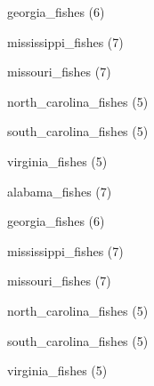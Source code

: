 \documentclass[11pt]{article}
\begin{document}
\begin{multicols}{2}
\vspace{1\baselineskip}

georgia\_fishes (6)

\vspace{1\baselineskip}

mississippi\_fishes (7)

\vspace{1\baselineskip}

missouri\_fishes (7)

\vspace{1\baselineskip}

north\_carolina\_fishes (5)

\vspace{1\baselineskip}

south\_carolina\_fishes (5)

\vspace{1\baselineskip}

virginia\_fishes (5)

\vspace{1\baselineskip}

alabama\_fishes (7)

\vspace{1\baselineskip}

georgia\_fishes (6)

\vspace{1\baselineskip}

mississippi\_fishes (7)

\vspace{1\baselineskip}

missouri\_fishes (7)

\vspace{1\baselineskip}

north\_carolina\_fishes (5)

\vspace{1\baselineskip}

south\_carolina\_fishes (5)

\vspace{1\baselineskip}

virginia\_fishes (5)

\end{multicols}
\end{document}
